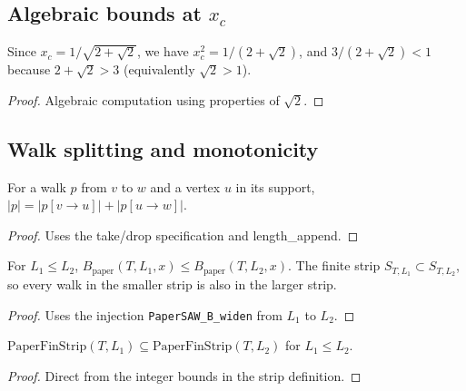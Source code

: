 \begin{lemma}
\begin{enumerate}
\subsection{Algebraic bounds at $x_c$}

\begin{lemma}[$3x_c^2 < 1$]\label{lem:three-xc-sq}
\leanok
  Since $x_c = 1/\sqrt{2+\sqrt{2}}$, we have $x_c^2 = 1/(2+\sqrt{2})$,
  and $3/(2+\sqrt{2}) < 1$ because $2+\sqrt{2} > 3$ (equivalently $\sqrt{2} > 1$).
\end{lemma}
\begin{proof}\leanok
  Algebraic computation using properties of $\sqrt{2}$.
\end{proof}

\subsection{Walk splitting and monotonicity}

\begin{lemma}\label{lem:walk-split}
\leanok
  For a walk $p$ from $v$ to $w$ and a vertex $u$ in its support,
  $|p| = |p[v \to u]| + |p[u \to w]|$.
\end{lemma}
\begin{proof}\leanok
  Uses the take/drop specification and length\_append.
\end{proof}

\begin{lemma}\label{lem:bpaper-mono}
\leanok
  For $L_1 \leq L_2$, $B_{\text{paper}}(T, L_1, x) \leq B_{\text{paper}}(T, L_2, x)$.
  The finite strip $S_{T,L_1} \subset S_{T,L_2}$, so every walk in the
  smaller strip is also in the larger strip.
\end{lemma}
\begin{proof}\leanok
  Uses the injection \texttt{PaperSAW\_B\_widen} from $L_1$ to $L_2$.
\end{proof}

\begin{lemma}\label{lem:strip-mono-L}
\leanok
  $\text{PaperFinStrip}(T, L_1) \subseteq \text{PaperFinStrip}(T, L_2)$ for $L_1 \leq L_2$.
\end{lemma}
\begin{proof}\leanok
  Direct from the integer bounds in the strip definition.
\end{proof}


\end{enumerate}
\end{lemma}
